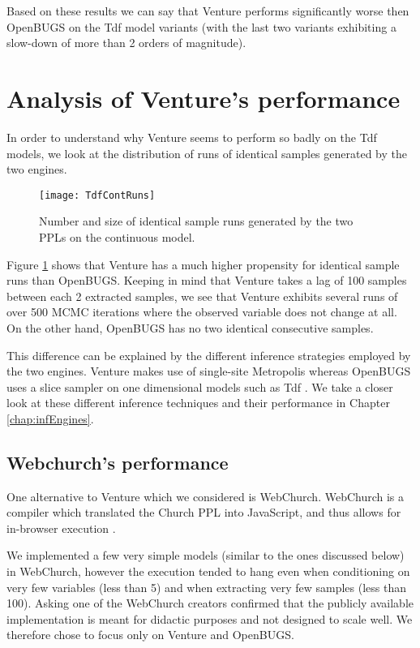 Based on these results we can say that Venture performs significantly worse then OpenBUGS on the Tdf model variants (with the last two variants exhibiting a slow-down of more than 2 orders of magnitude).

\section{Analysis of Venture's performance}

In order to understand why Venture seems to perform so badly on the Tdf models, we look at the distribution of runs of identical samples generated by the two engines.

\begin{figure}[h]
    \centering
    \texttt{[image: TdfContRuns]}
    \caption{Number and size of identical sample runs generated by the two PPLs on the continuous model.}
    \label{fig:tdfContRun}
\end{figure}

Figure \ref{fig:tdfContRun} shows that Venture has a much higher propensity for identical sample runs than OpenBUGS. Keeping in mind that Venture takes a lag of 100 samples between each 2 extracted samples, we see that Venture exhibits several runs of over 500 MCMC iterations where the observed variable does not change at all. On the other hand, OpenBUGS has no two identical consecutive samples.

This difference can be explained by the different inference strategies employed by the two engines. Venture makes use of single-site Metropolis whereas OpenBUGS uses a slice sampler on one dimensional models such as Tdf \cite{lunn2000winbugs, keith2008generalized}. We take a closer look at these different inference techniques and their performance in Chapter \ref{chap:infEngines}.


\subsection{Webchurch's performance}
One alternative to Venture which we considered is WebChurch. WebChurch is a compiler which translated the Church PPL into JavaScript, and thus allows for in-browser execution \cite{webChurch}.

We implemented a few very simple models (similar to the ones discussed below) in WebChurch, however the execution tended to hang even when conditioning on very few variables (less than 5) and when extracting very few samples (less than 100). Asking one of the WebChurch creators confirmed that the publicly available implementation is meant for didactic purposes and not designed to scale well. We therefore chose to focus only on Venture and OpenBUGS.
